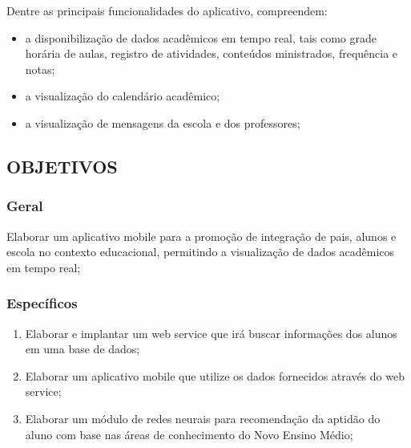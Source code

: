 Dentre as principais funcionalidades do aplicativo, compreendem:
\begin{itemize}
	\item a disponibilização de dados acadêmicos em tempo real, tais como grade horária de aulas, registro de atividades, conteúdos ministrados, frequência e notas;
	\item a visualização do calendário acadêmico;
	\item a visualização de mensagens da escola e dos professores;
\end{itemize}

\subsection{OBJETIVOS}

\subsubsection{Geral}

Elaborar um aplicativo mobile para a promoção de integração de pais, alunos e escola no contexto educacional, permitindo a visualização de dados acadêmicos em tempo real;

\subsubsection{Específicos}

\begin{enumerate}
	\item Elaborar e implantar um web service que irá buscar informações dos alunos em uma base de dados;
	\item Elaborar um aplicativo mobile que utilize os dados fornecidos através do web service;
	\item Elaborar um módulo de redes neurais para recomendação da aptidão do aluno com base nas áreas de conhecimento do Novo Ensino Médio;
\end{enumerate}
